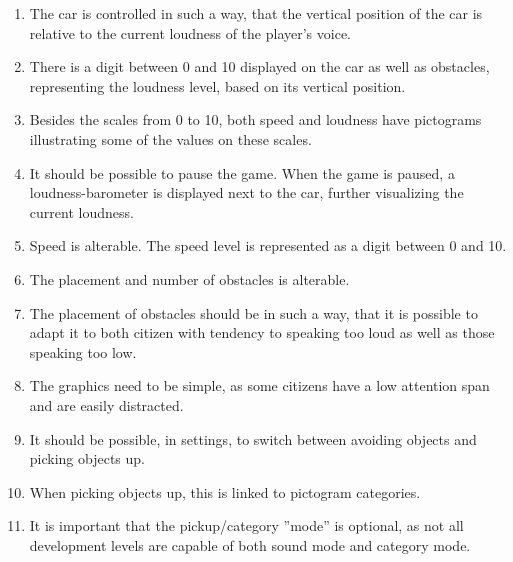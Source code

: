 \begin{enumerate}
\item The car is controlled in such a way, that the vertical position of the car is relative to the current loudness of the player's voice.
\item There is a digit between 0 and 10 displayed on the car as well as obstacles, representing the loudness level, based on its vertical position. 
\item Besides the scales from 0 to 10, both speed and loudness have pictograms illustrating some of the values on these scales.
\item It should be possible to pause the game. When the game is paused, a loudness-barometer is displayed next to the car, further visualizing the current loudness.
\item Speed is alterable. The speed level is represented as a digit between 0 and 10.
\item The placement and number of obstacles is alterable.
\item The placement of obstacles should be in such a way, that it is possible to adapt it to both citizen with tendency to speaking too loud as well as those speaking too low.
\item The graphics need to be simple, as some citizens have a low attention span and are easily distracted.
\item It should be possible, in settings, to switch between avoiding objects and picking objects up.
\item When picking objects up, this is linked to pictogram categories.
\item It is important that the pickup/category ''mode'' is optional, as not all development levels are capable of both sound mode and category mode.
\end{enumerate}